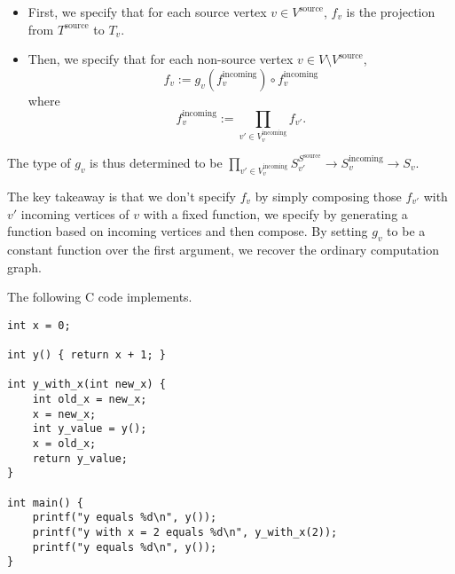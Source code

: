 \documentclass{article}
\begin{document}
\begin{itemize}
	\item First, we specify that for each source vertex $v\in V^{\text{source}}$, $f_v$ is the projection from $T^{\text{source}}$ to $T_v$.
	\item Then, we specify that for each non-source vertex $v\in V\setminus V^{\text{source}}$,
	      \begin{equation}
		      f_v:=g_v(f^{\text{incoming}}_v)\circ f^{\text{incoming}}_v
	      \end{equation}
	      where
	      \begin{equation}
		      f^{\text{incoming}}_v:=\prod_{v'\in V^{\text{incoming}}_v}f_{v'}.
	      \end{equation}
\end{itemize}

The type of $g_v$ is thus determined to be $\prod\limits_{v'\in V^{\text{incoming}}_{v}}S_{v'}^{S^{\text{source}} }\rightarrow S^{\text{incoming}}_v\rightarrow S_v$.

The key takeaway is that we don't specify $f_v$ by simply composing those $f_{v'}$ with $v'$ incoming vertices of $v$ with a fixed function, we specify by generating a function based on incoming vertices and then compose. By setting $g_v$ to be a constant function over the first argument, we recover the ordinary computation graph.

The following C code implements.
\begin{verbatim}
int x = 0;

int y() { return x + 1; }

int y_with_x(int new_x) {
	int old_x = new_x;
	x = new_x;
	int y_value = y();
	x = old_x;
	return y_value;
}

int main() {
	printf("y equals %d\n", y());
	printf("y with x = 2 equals %d\n", y_with_x(2));
	printf("y equals %d\n", y());
}
\end{verbatim}

\end{document}
